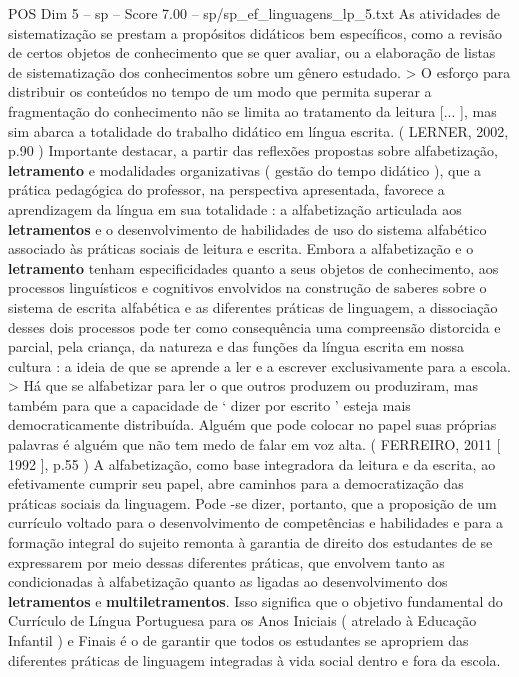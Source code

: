 \begin{textsample}{POS Dim 5 – sp – Score 7.00 – sp/sp\_ef\_linguagens\_lp\_5.txt}
As atividades de sistematização se prestam a propósitos didáticos bem específicos, como a revisão de certos objetos de conhecimento que se quer avaliar, ou a elaboração de listas de sistematização dos conhecimentos sobre um gênero estudado. > O esforço para distribuir os conteúdos no tempo de um modo que permita superar a fragmentação do conhecimento não se limita ao tratamento da leitura [... ], mas sim abarca a totalidade do trabalho didático em língua escrita. ( LERNER, 2002, p.90 ) Importante destacar, a partir das reflexões propostas sobre alfabetização, \textbf{letramento} e modalidades organizativas ( gestão do tempo didático ), que a prática pedagógica do professor, na perspectiva apresentada, favorece a aprendizagem da língua em sua totalidade : a alfabetização articulada aos \textbf{letramentos} e o desenvolvimento de habilidades de uso do sistema alfabético associado às práticas sociais de leitura e escrita.
Embora a alfabetização e o \textbf{letramento} tenham especificidades quanto a seus objetos de conhecimento, aos processos linguísticos e cognitivos envolvidos na construção de saberes sobre o sistema de escrita alfabética e as diferentes práticas de linguagem, a dissociação desses dois processos pode ter como consequência uma compreensão distorcida e parcial, pela criança, da natureza e das funções da língua escrita em nossa cultura : a ideia de que se aprende a ler e a escrever exclusivamente para a escola. > Há que se alfabetizar para ler o que outros produzem ou produziram, mas também para que a capacidade de ‘ dizer por escrito ’ esteja mais democraticamente distribuída.
Alguém que pode colocar no papel suas próprias palavras é alguém que não tem medo de falar em voz alta. ( FERREIRO, 2011 [ 1992 ], p.55 ) A alfabetização, como base integradora da leitura e da escrita, ao efetivamente cumprir seu papel, abre caminhos para a democratização das práticas sociais da linguagem.
Pode -se dizer, portanto, que a proposição de um currículo voltado para o desenvolvimento de competências e habilidades e para a formação integral do sujeito remonta à garantia de direito dos estudantes de se expressarem por meio dessas diferentes práticas, que envolvem tanto as condicionadas à alfabetização quanto as ligadas ao desenvolvimento dos \textbf{letramentos} e \textbf{multiletramentos}.
Isso significa que o objetivo fundamental do Currículo de Língua Portuguesa para os Anos Iniciais ( atrelado à Educação Infantil ) e Finais é o de garantir que todos os estudantes se apropriem das diferentes práticas de linguagem integradas à vida social dentro e fora da escola.

\end{textsample}
